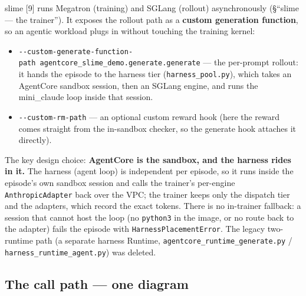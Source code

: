 \documentclass[
  paper=a4,
  ,captions=tableheading
]{scrartcl}
\providecommand{\tightlist}{%
  \setlength{\itemsep}{0pt}\setlength{\parskip}{0pt}}
\begin{document}
slime {[}9{]} runs Megatron (training) and SGLang (rollout)
asynchronously (§``slime --- the trainer''). It exposes the rollout path
as a \textbf{custom generation function}, so an agentic workload plugs
in without touching the training kernel:

\begin{itemize}
\tightlist
\item
  \texttt{-\/-custom-generate-function-path\ agentcore\_slime\_demo.generate.generate}
  --- the per-prompt rollout: it hands the episode to the harness tier
  (\texttt{harness\_pool.py}), which takes an AgentCore sandbox session,
  then an SGLang engine, and runs the mini\_claude loop inside that
  session.
\item
  \texttt{-\/-custom-rm-path} --- an optional custom reward hook (here
  the reward comes straight from the in-sandbox checker, so the generate
  hook attaches it directly).
\end{itemize}

The key design choice: \textbf{AgentCore is the sandbox, and the harness
rides in it.} The harness (agent loop) is independent per episode, so it
runs inside the episode's own sandbox session and calls the trainer's
per-engine \texttt{AnthropicAdapter} back over the VPC; the trainer
keeps only the dispatch tier and the adapters, which record the exact
tokens. There is no in-trainer fallback: a session that cannot host the
loop (no \texttt{python3} in the image, or no route back to the adapter)
fails the episode with \texttt{HarnessPlacementError}. The legacy
two-runtime path (a separate harness Runtime,
\texttt{agentcore\_runtime\_generate.py} /
\texttt{harness\_runtime\_agent.py}) was deleted.

\hypertarget{the-call-path-one-diagram}{%
\subsection{The call path --- one
diagram}\label{the-call-path-one-diagram}}
\end{document}
